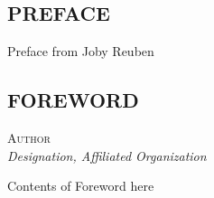 \documentclass[../alan-handbook.tex]{subfiles}
\begin{document}
\normalsize

\subsection*{PREFACE} \label{Preface}


Preface from Joby Reuben

\subsection*{FOREWORD} \label{Foreword}

\begin{center}
    \vspace{2mm}
    \textsc{Author} \\
    \textit{\scriptsize{Designation, Affiliated Organization}}
\end{center}


Contents of Foreword here
\end{document}
